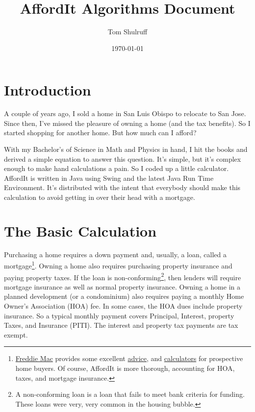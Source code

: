 \documentclass{article}
\title{AffordIt Algorithms Document}
\author{Tom Shulruff}
\date{\today}
\begin{document}
\maketitle

\section{Introduction}

A couple of years ago, I sold a home in San Luis Obispo to relocate
to San Jose.  Since then, I've missed
the pleasure of owning a home (and the tax benefits).  So I started
shopping for another home.  But how much can I afford?

With my Bachelor's of Science in Math and Physics in hand, I hit
the books and derived a simple equation to answer this question.
It's simple, but it's complex
enough to make hand calculations a pain.  So I coded up a little
calculator. AffordIt is written in Java using Swing and the latest
 Java Run Time
Environment.  It's distributed with the intent that everybody 
should make this calculation to avoid getting in over their head with
a mortgage.

\section{The Basic Calculation}

Purchasing a home requires a down payment and, usually, a loan,
called a mortgage\footnote{
\href{http://www.freddiemac.com}{Freddie Mac} 
provides some excellent 
\href{http://www.freddiemac.com/corporate/buying_and_owning.html}{advice}, 
and 
\href{http://www.freddiemac.com/corporate/buyown/english/calcs_tools/}{calculators}  
for prospective home buyers.
Of course, AffordIt is more thorough, accounting for HOA, taxes, and mortgage
 insurance.}.
Owning a home also requires purchasing property insurance 
and paying property taxes.  
If the loan is non-conforming\footnote{
A non-conforming loan is a loan that fails to meet bank criteria for 
funding.
These loans were very, very common in the housing bubble.},
then lenders will require mortgage insurance as well as normal
property insurance.
Owning a home
in a planned development (or a condominium) also requires paying
a monthly Home Owner's Association (HOA) fee. In some cases, the HOA 
dues include
property insurance.
So a typical monthly payment covers 
Principal, Interest, property Taxes, and Insurance (PITI).  
The interest and property tax payments are tax exempt.  
\end{document}
